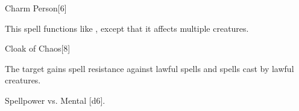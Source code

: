 \begin{spellsection}[Mass]{Charm Person}[6]
    \begin{spellheader}
    \end{spellheader}
    \begin{spellcontent}
        \begin{spelltargetinginfo}
        \end{spelltargetinginfo}
        \begin{spelleffects}
            \spellspecial This spell functions like , except that it affects multiple creatures.
        \end{spelleffects}
    \end{spellcontent}
    \begin{spellfooter}
        \miscastexplode
    \end{spellfooter}
\end{spellsection}

\begin{spellsection}{Cloak of Chaos}[8]
    \begin{spellheader}
    \end{spellheader}
    \begin{spellcontent}
        \begin{spelltargetinginfo}
        \end{spelltargetinginfo}
        \begin{spelleffects}
            \spelleffect The target gains spell resistance against lawful spells and spells cast by lawful creatures.
            \spelldur \durshort \dismissable
        \end{spelleffects}
    \end{spellcontent}
    \begin{spellsubcontent}
        \begin{spelltargetinginfo}
        \end{spelltargetinginfo}
        \begin{spelleffects}
            \begin{spellattack}{Spellpower vs. Mental}
                \spellsuccess {}[d6].
            \end{spellattack}
        \end{spelleffects}
    \end{spellsubcontent}
    \begin{spellfooter}
        \miscastexplode
    \end{spellfooter}
\end{spellsection}

